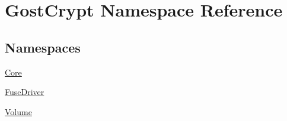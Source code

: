 \hypertarget{namespace_gost_crypt}{}\section{Gost\+Crypt Namespace Reference}
\label{namespace_gost_crypt}
\subsection*{Namespaces}
\begin{DoxyCompactItemize}
\item 
 \hyperlink{namespace_gost_crypt_1_1_core}{Core}
\item 
 \hyperlink{namespace_gost_crypt_1_1_fuse_driver}{Fuse\+Driver}
\item 
 \hyperlink{namespace_gost_crypt_1_1_volume}{Volume}
\end{DoxyCompactItemize}

